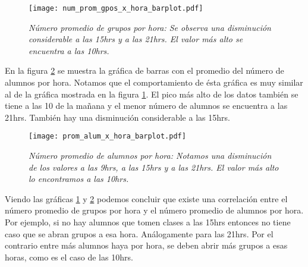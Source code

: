 \begin{figure}[H]
\centering
\texttt{[image: num\_prom\_gpos\_x\_hora\_barplot.pdf]} %
\caption[\textit{Número promedio de grupos por hora}]{\textit{Número promedio de grupos por hora: Se observa una disminución considerable a las 15hrs y a las 21hrs. El valor más alto se encuentra a las 10hrs.}}\label{num_prom_gpos_x_hora_barplot}
\end{figure}

En la figura \ref{prom_alum_x_hora_barplot} se muestra la gráfica de barras con el promedio del número de alumnos por hora. Notamos que el comportamiento de ésta gráfica es muy similar al de la gráfica mostrada en la figura \ref{num_prom_gpos_x_hora_barplot}. El pico más alto de los datos también se tiene a las 10 de la mañana y el menor número de alumnos se encuentra a las 21hrs. También hay una disminución considerable a las 15hrs.

\begin{figure}[H]
\centering
\texttt{[image: prom\_alum\_x\_hora\_barplot.pdf]} %
\caption[\textit{Número promedio de alumnos por hora}]{\textit{Número promedio de alumnos por hora: Notamos una disminución de los valores a las 9hrs, a las 15hrs y a las 21hrs. El valor más alto lo encontramos a las 10hrs.}}\label{prom_alum_x_hora_barplot}
\end{figure}

Viendo las gráficas \ref{num_prom_gpos_x_hora_barplot} y \ref{prom_alum_x_hora_barplot} podemos concluir que existe una correlación entre el número promedio de grupos por hora y el número promedio de alumnos por hora. Por ejemplo, si no hay alumnos que tomen clases a las 15hrs entonces no tiene caso que se abran grupos a esa hora. Análogamente para las 21hrs. Por el contrario entre más alumnos haya por hora, se deben abrir más grupos a esas horas, como es el caso de las 10hrs.